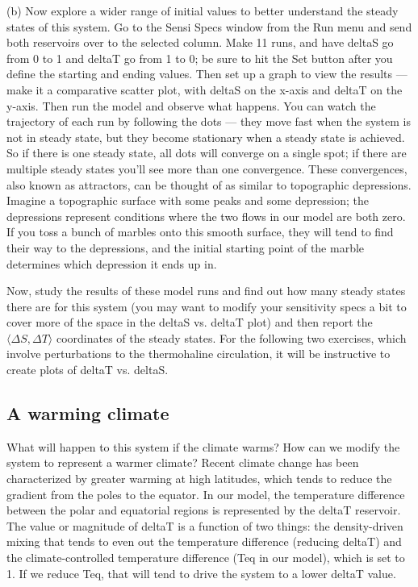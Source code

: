 \documentclass[11pt,letterpaper]{article}
\begin{document}
(b) Now explore a wider range of initial values to better understand the steady states of this system. Go to the Sensi Specs window from the Run menu and send both reservoirs over to the selected column. Make 11 runs, and have deltaS go from 0 to 1 and deltaT go from 1 to 0; be sure to hit the Set button after you define the starting and ending values. Then set up a graph to view the results --- make it a comparative scatter plot, with deltaS on the x-axis and deltaT on the y-axis. Then run the model and observe what happens. You can watch the trajectory of each run by following the dots --- they move fast when the system is not in steady state, but they become stationary when a steady state is achieved. So if there is one steady state, all dots will converge on a single spot; if there are multiple steady states you’ll see more than one convergence. These convergences, also known as attractors, can be thought of as similar to topographic depressions. Imagine a topographic surface with some peaks and some depression; the depressions represent conditions where the two flows in our model are both zero. If you toss a bunch of marbles onto this smooth surface, they will tend to find their way to the depressions, and the initial starting point of the marble determines which depression it ends up in.

Now, study the results of these model runs and find out how many steady states there are for this system (you may want to modify your sensitivity specs a bit to cover more of the space in the deltaS vs. deltaT plot) and then report the $\langle\Delta S, \Delta T\rangle$ coordinates of the steady states. For the following two exercises, which involve perturbations to the thermohaline circulation, it will be instructive to create plots of deltaT vs. deltaS.

\subsection{A warming climate}
What will happen to this system if the climate warms? How can we modify the system to represent a warmer climate? Recent climate change has been characterized by greater warming at high latitudes, which tends to reduce the gradient from the poles to the equator. In our model, the temperature difference between the polar and equatorial regions is represented by the deltaT reservoir. The value or magnitude of deltaT is a function of two things: the density-driven mixing that tends to even out the temperature difference (reducing deltaT) and the climate-controlled temperature difference (Teq in our model), which is set to 1. If we reduce Teq, that will tend to drive the system to a lower deltaT value.
\end{document}
